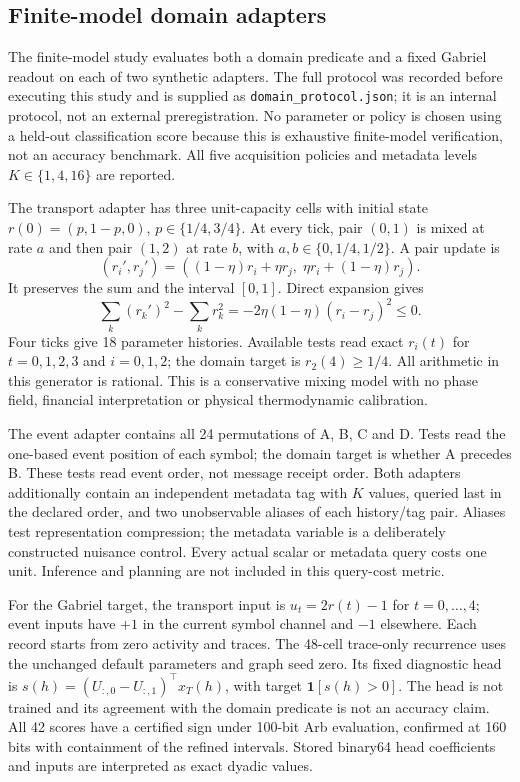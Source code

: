\documentclass[11pt,a4paper]{article}
\theoremstyle{definition}\newtheorem{definition}[theorem]{Definition}
\begin{document}
\subsection{Finite-model domain adapters}\label{sec:domainprotocol}
The finite-model study evaluates both a domain predicate and a fixed Gabriel readout on each of two synthetic adapters. The full protocol was recorded before executing this study and is supplied as \texttt{domain\_protocol.json}; it is an internal protocol, not an external preregistration. No parameter or policy is chosen using a held-out classification score because this is exhaustive finite-model verification, not an accuracy benchmark. All five acquisition policies and metadata levels $K\in\{1,4,16\}$ are reported.

The transport adapter has three unit-capacity cells with initial state $r(0)=(p,1-p,0)$, $p\in\{1/4,3/4\}$. At every tick, pair $(0,1)$ is mixed at rate $a$ and then pair $(1,2)$ at rate $b$, with $a,b\in\{0,1/4,1/2\}$. A pair update is
\begin{equation}
 (r_i',r_j')=((1-\eta)r_i+\eta r_j,\;\eta r_i+(1-\eta)r_j).
 \label{eq:carriermix}
\end{equation}
It preserves the sum and the interval $[0,1]$. Direct expansion gives
\begin{equation}
 \sum_k(r_k')^2-\sum_k r_k^2=-2\eta(1-\eta)(r_i-r_j)^2\leq0.
\end{equation}
Four ticks give 18 parameter histories. Available tests read exact $r_i(t)$ for $t=0,1,2,3$ and $i=0,1,2$; the domain target is $r_2(4)\geq1/4$. All arithmetic in this generator is rational. This is a conservative mixing model with no phase field, financial interpretation or physical thermodynamic calibration.

The event adapter contains all 24 permutations of A, B, C and D. Tests read the one-based event position of each symbol; the domain target is whether A precedes B. These tests read event order, not message receipt order. Both adapters additionally contain an independent metadata tag with $K$ values, queried last in the declared order, and two unobservable aliases of each history/tag pair. Aliases test representation compression; the metadata variable is a deliberately constructed nuisance control. Every actual scalar or metadata query costs one unit. Inference and planning are not included in this query-cost metric.

For the Gabriel target, the transport input is $u_t=2r(t)-1$ for $t=0,\ldots,4$; event inputs have $+1$ in the current symbol channel and $-1$ elsewhere. Each record starts from zero activity and traces. The 48-cell trace-only recurrence uses the unchanged default parameters and graph seed zero. Its fixed diagnostic head is $s(h)=(U_{:,0}-U_{:,1})^\top x_T(h)$, with target $\mathbf1[s(h)>0]$. The head is not trained and its agreement with the domain predicate is not an accuracy claim. All 42 scores have a certified sign under 100-bit Arb evaluation, confirmed at 160 bits with containment of the refined intervals. Stored binary64 head coefficients and inputs are interpreted as exact dyadic values.
\end{document}

